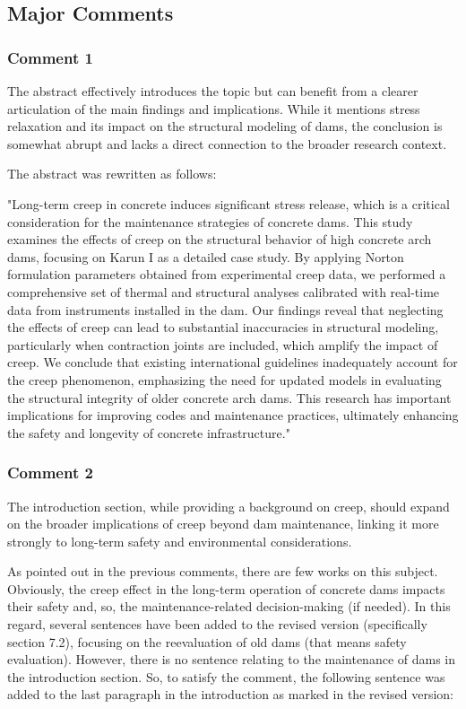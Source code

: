 \documentclass{ar2rc}
\begin{document}
{	\subsection{Major Comments}
	\subsubsection{Comment 1}
	\RC The abstract effectively introduces the topic but can benefit from a clearer articulation of the main findings and implications. While it mentions stress relaxation and its impact on the	structural modeling of dams, the conclusion is somewhat abrupt and lacks a direct connection to the broader research context.
	
	\AR The abstract was rewritten as follows:
	
	"Long-term creep in concrete induces significant stress release, which is a critical consideration for the maintenance strategies of concrete dams. This study examines the effects of creep on the structural behavior of high concrete arch dams, focusing on Karun I as a detailed case study. By applying Norton formulation parameters obtained from experimental creep data, we performed a comprehensive set of thermal and structural analyses calibrated with real-time data from instruments installed in the dam. Our findings reveal that neglecting the effects of creep can lead to substantial inaccuracies in structural modeling, particularly when contraction joints are included, which amplify the impact of creep. We conclude that existing international guidelines inadequately account for the creep phenomenon, emphasizing the need for updated models in evaluating the structural integrity of older concrete arch dams. This research has important implications for improving codes and maintenance practices, ultimately enhancing the safety and longevity of concrete infrastructure."
	
	\subsubsection{Comment 2}
	\RC The introduction section, while providing a background on creep, should expand on the broader implications of creep beyond dam maintenance, linking it more strongly to long-term safety and environmental considerations.
	
	\AR As pointed out in the previous comments, there are few works on this subject. Obviously, the creep effect in the long-term operation of concrete dams impacts their safety and, so, the maintenance-related decision-making (if needed). In this regard, several sentences have been added to the revised version (specifically section 7.2), focusing on the reevaluation of old dams (that means safety evaluation). However, there is no sentence relating to the maintenance of dams in the introduction section. So, to satisfy the comment, the following sentence was added to the last paragraph in the introduction as marked in the revised version:
	
}
\end{document}
